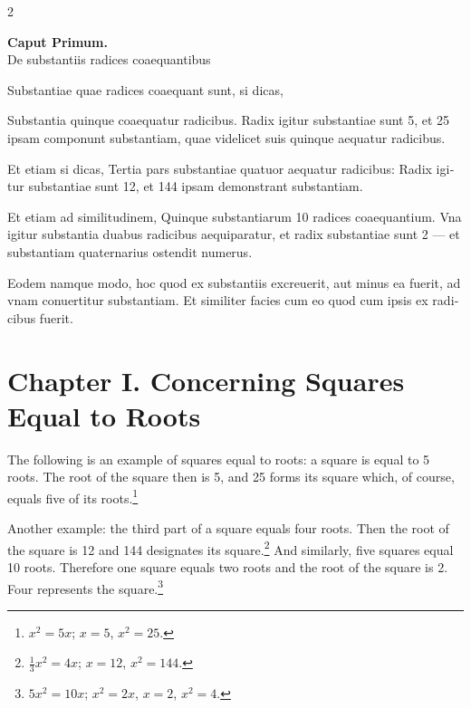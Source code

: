 \documentclass[11pt,a4paper,twoside]{book}
\newcommand{\latincolumn}[1]{\textlatin{\small #1}}
\begin{document}
\begin{paracol}{2}
\begin{center}
{\normalsize\bfseries\color{sectioncolor} Caput Primum.}\\[0.2cm]
\latincolumn{De substantiis radices coaequantibus}
\end{center}

\medskip

\latincolumn{Substantiae quae radices coaequant sunt, si dicas,}

\medskip

\latincolumn{Substantia quinque coaequatur radicibus. Radix igitur substantiae sunt 5, et 25 ipsam componunt substantiam, quae videlicet suis quinque aequatur radicibus.}

\medskip

\latincolumn{Et etiam si dicas, Tertia pars substantiae quatuor aequatur radicibus: Radix igitur substantiae sunt 12, et 144 ipsam demonstrant substantiam.}

\medskip

\latincolumn{Et etiam ad similitudinem, Quinque substantiarum 10 radices coaequantium. Vna igitur substantia duabus radicibus aequiparatur, et radix substantiae sunt 2 --- et substantiam quaternarius ostendit numerus.}

\medskip

\latincolumn{Eodem namque modo, hoc quod ex substantiis excreuerit, aut minus ea fuerit, ad vnam conuertitur substantiam. Et similiter facies cum eo quod cum ipsis ex radicibus fuerit.}

\switchcolumn

\section*{Chapter I. Concerning Squares Equal to Roots}

The following is an example of squares equal to roots: a square is equal to 5 roots. The root of the square then is 5, and 25 forms its square which, of course, equals five of its roots.\footnote{$x^2 = 5x$; $x = 5$, $x^2 = 25$.}

Another example: the third part of a square equals four roots. Then the root of the square is 12 and 144 designates its square.\footnote{$\frac{1}{3}x^2 = 4x$; $x = 12$, $x^2 = 144$.} And similarly, five squares equal 10 roots. Therefore one square equals two roots and the root of the square is 2. Four represents the square.\footnote{$5x^2 = 10x$; $x^2 = 2x$, $x = 2$, $x^2 = 4$.}


\end{paracol}
\end{document}
